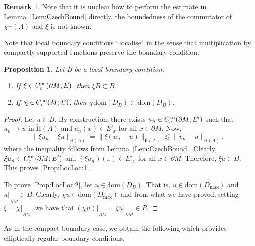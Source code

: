 \documentclass[a4paper,10pt,reqno]{amsart}
\newcommand{\rest}[1]{{{\lvert_{}}_{}}_{#1}}
\newcommand{\norm}[1]{\| #1 \|}%
\newcommand{\Ck}[2][{}]{{\rm C}^{#2}_{\rm #1}}%
\newcommand{\checkH}{\check{\mathrm{H}}}
\newcommand{\dom}{\mathrm{dom}}
\newcommand{\dM}{\partial M}
\newtheorem{proposition}[theorem]{Proposition}
\theoremstyle{definition}
\newtheorem{remark}[theorem]{Remark}
\begin{document}
\begin{remark}
Note that it is unclear how to perform the estimate in Lemma~\ref{Lem:CzechBound} directly,  the boundedness of the  commutator of  $\chi^{\pm}(A)$ and $\xi$ is not known.
\end{remark}

Note that local boundary conditions ``localise'' in the sense that multiplication by compactly supported functions preserve the boundary condition.
\begin{proposition}
\label{Prop:LocLoc}
Let $B$ be a local boundary condition.
\begin{enumerate}[label=(\roman*), labelwidth=0pt, labelindent=2pt, leftmargin=21pt]
\item \label{Prop:LocLoc:1}
      If $\xi \in \Ck[c]{\infty}(\dM;E)$, then $\xi B \subset B$.
\item \label{Prop:LocLoc:2}
      If $\chi \in \Ck[c]{\infty}(M;E)$, then $\chi \dom(D_{B}) \subset \dom(D_B)$.
\end{enumerate}
\end{proposition}
\begin{proof}
Let $u \in B$.
By construction, there exists $u_n \in \Ck[c]{\infty}(\dM;E')$ such that $u_n \to u$ in $\checkH(A)$ and $u_n(x) \in E'_x$ for all $x \in \dM$.
Now,
$$ \norm{\xi u_n - \xi u}_{\checkH(A)}  = \norm{ \xi (u_n - u)}_{\checkH(A)} \lesssim \norm{u_n - u}_{\checkH(A)},$$
where the inequality follows from Lemma~\ref{Lem:CzechBound}.
Clearly, $\xi u_n \in \Ck[c]{\infty}(\dM;E')$ and $(\xi u_n)(x) \in E'_x$ for all $x \in \dM$.
Therefore, $\xi u \in B$.
This proves \ref{Prop:LocLoc:1}.

To prove \ref{Prop:LocLoc:2}, let $u \in \dom(D_B)$.
That is, $u \in \dom(D_{\max})$ and $u \rest{\dM} \in B$.
Clearly, $\chi u \in \dom(D_{\max})$ and from what we have proved, setting $\xi = \chi\rest{\dM}$, we have that $(\chi u)\rest{\dM} = \xi u\rest{\dM} \in B$.
\end{proof}

As in the compact boundary case, we obtain the following which provides elliptically regular boundary conditions.
\end{document}
